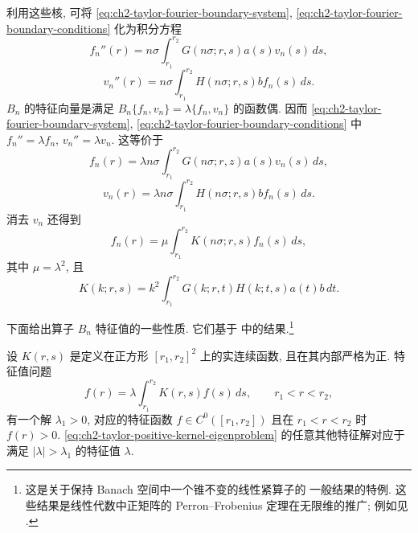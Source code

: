 利用这些核, 可将 \eqref{eq:ch2-taylor-fourier-boundary-system}, \eqref{eq:ch2-taylor-fourier-boundary-conditions} 化为积分方程
\begin{equation}
f_n''(r)=n\sigma\int_{r_1}^{r_2}G(n\sigma;r,s)a(s)v_n(s)\,ds,
\label{eq:ch2-taylor-integral-f-double-prime}
\end{equation}
\begin{equation}
v_n''(r)=n\sigma\int_{r_1}^{r_2}H(n\sigma;r,s)bf_n(s)\,ds.
\label{eq:ch2-taylor-integral-v-double-prime}
\end{equation}
$B_n$ 的特征向量是满足 $B_n\{f_n,v_n\}=\lambda\{f_n,v_n\}$ 的函数偶. 因而 \eqref{eq:ch2-taylor-fourier-boundary-system}, \eqref{eq:ch2-taylor-fourier-boundary-conditions} 中 $f_n''=\lambda f_n$, $v_n''=\lambda v_n$. 这等价于
\begin{equation}
f_n(r)=\lambda n\sigma\int_{r_1}^{r_2}G(n\sigma;r,z)a(s)v_n(s)\,ds,
\label{eq:ch2-taylor-eigen-integral-f}
\end{equation}
\begin{equation}
v_n(r)=\lambda n\sigma\int_{r_1}^{r_2}H(n\sigma;r,s)bf_n(s)\,ds.
\label{eq:ch2-taylor-eigen-integral-v}
\end{equation}
消去 $v_n$ 还得到
\begin{equation}
f_n(r)=\mu\int_{r_1}^{r_2}K(n\sigma;r,s)f_n(s)\,ds,
\label{eq:ch2-taylor-reduced-eigenproblem}
\end{equation}
其中 $\mu=\lambda^2$, 且
\begin{equation}
K(k;r,s)=k^2\int_{r_1}^{r_2}G(k;r,t)H(k;t,s)a(t)b\,dt.
\label{eq:ch2-taylor-positive-kernel}
\end{equation}

\hypertarget{chapter-02-page-175}{}
下面给出算子 $B_n$ 特征值的一些性质. 它们基于  中的结果.\footnote{这是关于保持 Banach 空间中一个锥不变的线性紧算子的  一般结果的特例. 这些结果是线性代数中正矩阵的 Perron--Frobenius 定理在无限维的推广; 例如见 .}

\begin{Lemma}
\label{lem:ch2-taylor-positive-kernel-eigenvalue}
设 $K(r,s)$ 是定义在正方形 $[r_1,r_2]^2$ 上的实连续函数, 且在其内部严格为正. 特征值问题
\begin{equation}
f(r)=\lambda\int_{r_1}^{r_2}K(r,s)f(s)\,ds,
\qquad r_1<r<r_2,
\label{eq:ch2-taylor-positive-kernel-eigenproblem}
\end{equation}
有一个解 $\lambda_1>0$, 对应的特征函数 $f\in C^0([r_1,r_2])$ 且在 $r_1<r<r_2$ 时 $f(r)>0$. \eqref{eq:ch2-taylor-positive-kernel-eigenproblem} 的任意其他特征解对应于满足 $|\lambda|>\lambda_1$ 的特征值 $\lambda$.
\end{Lemma}

